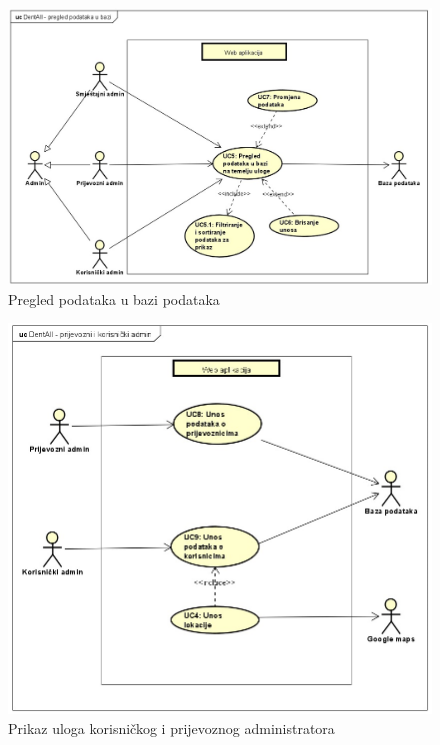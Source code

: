 				\begin{figure}[H]
					\includegraphics[width=\linewidth]{slike/DentAll_PregledPodatakaUBazi.PNG}
					\centering
					\caption{Pregled podataka u bazi podataka}
					\label{fig:pregledPodataka}
				\end{figure}
				
				\begin{figure}[H]
					\includegraphics[width=\linewidth]{slike/DentAll_PrijevozniIKorisničkiAdmin.png}
					\centering
					\caption{Prikaz uloga korisničkog i prijevoznog administratora}
					\label{fig:prijevozniIKorisničkiAdmin}
				\end{figure}
				
